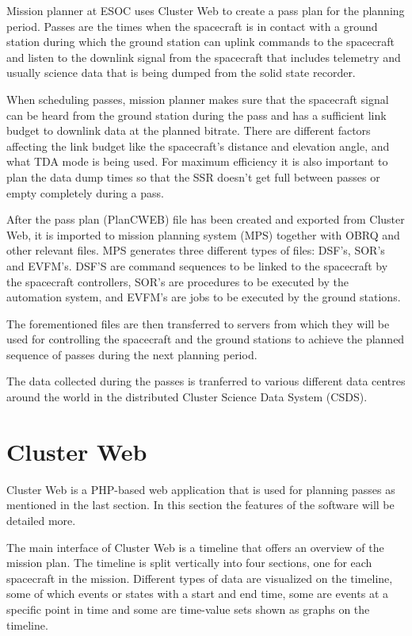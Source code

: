 Mission planner at ESOC uses Cluster Web to create a pass plan for the planning period. Passes are the times when the spacecraft is in contact with a ground station during which the ground station can uplink commands to the spacecraft and listen to the downlink signal from the spacecraft that includes telemetry and usually science data that is being dumped from the solid state recorder.

When scheduling passes, mission planner makes sure that the spacecraft signal can be heard from the ground station during the pass and has a sufficient link budget to downlink data at the planned bitrate. There are different factors affecting the link budget like the spacecraft's distance and elevation angle, and what TDA mode is being used. For maximum efficiency it is also important to plan the data dump times so that the SSR doesn't get full between passes or empty completely during a pass.

After the pass plan (PlanCWEB) file has been created and exported from Cluster Web, it is imported to mission planning system (MPS) together with OBRQ and other relevant files. MPS generates three different types of files: DSF's, SOR's and EVFM's. DSF'S are command sequences to be linked to the spacecraft  by the spacecraft controllers, SOR's are procedures to be executed by the automation system, and EVFM's are jobs to be executed by the ground stations.

The forementioned files are then transferred to servers from which they will be used for controlling the spacecraft and the ground stations to achieve the planned sequence of passes during the next planning period.

The data collected during the passes is tranferred to various different data centres around the world in the distributed Cluster Science Data System (CSDS).

\cite{esasci, esacluster}

\section{Cluster Web}\label{clusterweb_section}
Cluster Web is a PHP-based web application that is used for planning passes as mentioned in the last section. In this section the features of the software will be detailed more.

The main interface of Cluster Web is a timeline that offers an overview of the mission plan. The timeline is split vertically into four sections, one for each spacecraft in the mission. Different types of data are visualized on the timeline, some of which events or states with a start and end time, some are events at a specific point in time and some are time-value sets shown as graphs on the timeline.

